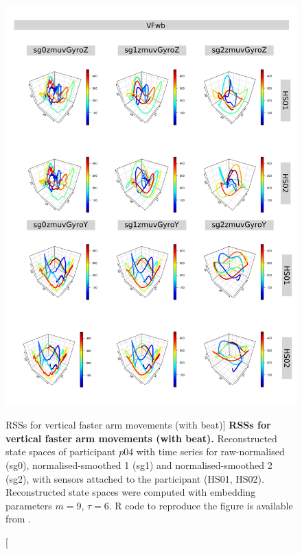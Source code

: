 \begin{figure}
\centering
\includegraphics[height=0.8\textheight]{rss_VFwb_p04}
\caption
	[RSSs for vertical faster arm movements (with beat)]{
	{\bf RSSs for vertical faster arm movements (with beat).}
	Reconstructed state spaces of participant $p04$
	with time series for raw-normalised (sg0), 
	normalised-smoothed 1 (sg1) and 
	normalised-smoothed 2 (sg2), 
	with sensors attached to the participant (HS01, HS02).
	Reconstructed state spaces were computed with 
	embedding parameters $m=9$, $\tau=6$.
	R code to reproduce the figure is available from \cite{hwum2018}.
        }
     \label{fig:rss_VFwb_p04}
\end{figure}






